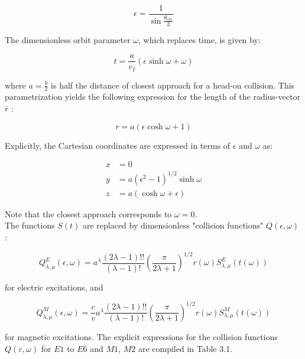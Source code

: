 \documentclass[10pt]{article}
\begin{document}
\begin{equation*}
\epsilon=\frac{1}{\sin \frac{\theta_{c m}}{2}} \tag{3.11}
\end{equation*}


The dimensionless orbit parameter $\omega$, which replaces time, is given by:


\begin{equation*}
t=\frac{a}{v_{I}}(\epsilon \sinh \omega+\omega) \tag{3.12}
\end{equation*}


where $a=\frac{b}{2}$ is half the distance of closest approach for a head-on collision. This parametrization yields the following expression for the length of the radius-vector $\bar{r}$ :


\begin{equation*}
r=a(\epsilon \cosh \omega+1) \tag{3.13}
\end{equation*}


Explicitly, the Cartesian coordinates are expressed in terms of $\epsilon$ and $\omega$ as:


\begin{align*}
x & =0  \tag{3.14}\\
y & =a\left(\epsilon^{2}-1\right)^{1 / 2} \sinh \omega \\
z & =a(\cosh \omega+\epsilon)
\end{align*}


Note that the closest approach corresponds to $\omega=0$.\\
The functions $S(t)$ are replaced by dimensionless "collision functions" $Q(\epsilon, \omega)$ :


\begin{equation*}
Q_{\lambda, \mu}^{E}(\epsilon, \omega)=a^{\lambda} \frac{(2 \lambda-1)!!}{(\lambda-1)!}\left(\frac{\pi}{2 \lambda+1}\right)^{1 / 2} r(\omega) S_{\lambda, \mu}^{E}(t(\omega)) \tag{3.15}
\end{equation*}


for electric excitations, and


\begin{equation*}
Q_{\lambda, \mu}^{M}(\epsilon, \omega)=\frac{c}{v} a^{\lambda} \frac{(2 \lambda-1)!!}{(\lambda-1)!}\left(\frac{\pi}{2 \lambda+1}\right)^{1 / 2} r(\omega) S_{\lambda, \mu}^{M}(t(\omega)) \tag{3.16}
\end{equation*}


for magnetic excitations. The explicit expressions for the collision functions $Q(\varepsilon, \omega)$ for $E 1$ to $E 6$ and $M 1$, $M 2$ are compiled in Table 3.1.
\end{document}
